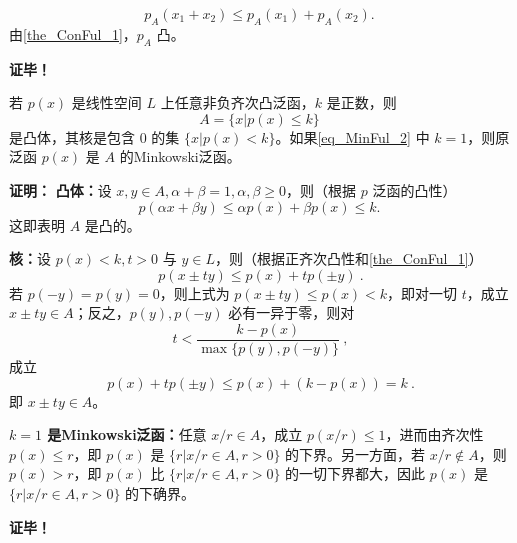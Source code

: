  \begin{equation}
p_A(x_1+x_2)\leq p_A(x_1)+p_A(x_2).~
 \end{equation}
 由\autoref{the_ConFul_1}，$p_A$ 凸。








\textbf{证毕！}

\begin{theorem}{}
若 $p(x)$ 是线性空间 $L$ 上任意非负齐次凸泛函，$k$ 是正数，则
\begin{equation}\label{eq_MinFul_2}
A=\{x|p(x)\leq k\}~
\end{equation}
是凸体，其核是包含 $0$ 的集 $\{x|p(x)<k\}$。如果\autoref{eq_MinFul_2} 中 $k=1$，则原泛函 $p(x)$ 是 $A$ 的Minkowski泛函。
\end{theorem}

\textbf{证明：}
\textbf{凸体：}设 $x,y\in A,\alpha+\beta=1,\alpha,\beta\geq0$，则（根据 $p$ 泛函的凸性）
\begin{equation}
p(\alpha x+\beta y)\leq\alpha p(x)+\beta p(x)\leq k.~
\end{equation}
这即表明 $A$ 是凸的。

\textbf{核：}设 $p(x)<k,t>0$ 与 $y\in L$，则（根据正齐次凸性和\autoref{the_ConFul_1}）
\begin{equation}
p(x\pm ty)\leq p(x)+tp(\pm y)~.
\end{equation}
若 $p(-y)=p(y)=0$，则上式为 $p(x\pm ty)\leq p(x)<k$，即对一切 $t$，成立 $x\pm ty\in A$；反之，$p(y),p(-y)$ 必有一异于零，则对
\begin{equation}
t<\frac{k-p(x)}{\max\{p(y),p(-y)\}}~,
\end{equation}
成立
\begin{equation}
p(x)+tp(\pm y)\leq p(x)+(k-p(x))=k~.
\end{equation}
即 $x\pm ty\in A$。

\textbf{$k=1$ 是Minkowski泛函：}任意 $x/r\in A$，成立 $p(x/r)\leq 1$，进而由齐次性 $p(x)\leq r$，即 $p(x)$ 是 $\{r|x/r\in A,r>0\}$ 的下界。另一方面，若 $x/r\notin A$，则 $p(x)>r$，即 $p(x)$ 比  $\{r|x/r\in A,r>0\}$ 的一切下界都大，因此 $p(x)$ 是 $\{r|x/r\in A,r>0\}$ 的下确界。

\textbf{证毕！}
